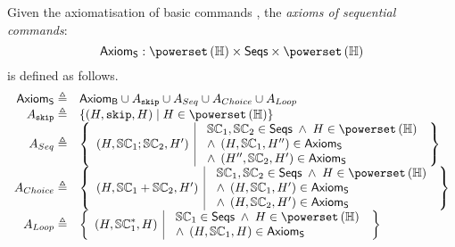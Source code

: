 \begin{definition}
Given the axiomatisation of basic commands \AxiomsB, the \emph{axioms of sequential commands}:
%
\[
	\AxiomsSeq : \pset{\Heaps} \times \Seqs \times \pset{\Heaps}
\]
%
is defined as follows.
%
\[
\begin{array}{r l}
	\AxiomsSeq \eqdef & \AxiomsB \cup A_{\skipC} \cup A_{Seq} \cup A_{Choice} \cup A_{Loop}\\
	
	A_{\skipC} \eqdef & \left\{(H, \skipC, H) \;|\; H \in \pset{\Heaps} \right\} \\
	
	A_{Seq} \eqdef & 
	\left\{
	\begin{array}{l | l}
		\left(H, \seq{1} ; \seq{2}, H' \right) 
		&
		\begin{array}{l}
			\seq{1}, \seq{2} \in \Seqs \;\land\; H \in \pset{\Heaps} \\
			\land\; \left(H, \seq{1}, H'' \right) \in \AxiomsSeq\\
			\land\; \left(H'', \seq{2}, H' \right) \in \AxiomsSeq 
		\end{array}
	\end{array}
	\right\}\\
	
	A_{Choice} \eqdef & 
	\left\{
	\begin{array}{l | l}
		\left(H, \seq{1} + \seq{2}, H' \right) 
		&
		\begin{array}{l}
			\seq{1}, \seq{2} \in \Seqs \;\land\; H \in \pset{\Heaps}\\
			\land\; \left(H, \seq{1}, H' \right) \in \AxiomsSeq \\
			\land\; \left(H, \seq{2}, H' \right) \in \AxiomsSeq
		\end{array}
	\end{array}
	\right\}\\
	
	A_{Loop} \eqdef & 
	\left\{
	\begin{array}{l | l}
		\left(H, \seq{1}^{*}, H \right) 
		&
		\begin{array}{l}
			\seq{1} \in \Seqs \;\land\; H \in \pset{\Heaps}\\
			\land\; \left(H, \seq{1}, H \right) \in \AxiomsSeq 
		\end{array}
	\end{array}
	\right\}
\end{array}
\]
%
\end{definition}
%
%
